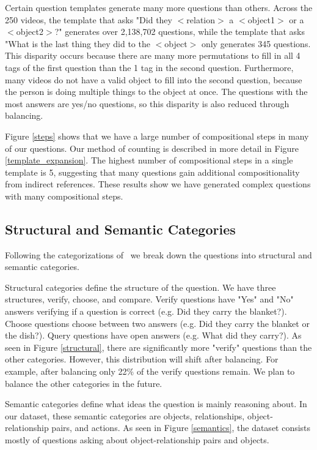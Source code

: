\documentclass[10pt,twocolumn,letterpaper]{article}
\begin{document}
Certain question templates generate many more questions than others. Across the 250 videos, the template that asks "Did they $<$relation$>$ a $<$object1$>$ or a $<$object2$>$?" generates over 2,138,702 questions, while the template that asks "What is the last thing they did to the $<$object$>$ only generates 345 questions. This disparity occurs because there are many more permutations to fill in all 4 tags of the first question than the 1 tag in the second question. Furthermore, many videos do not have a valid object to fill into the second question, because the person is doing multiple things to the object at once. The questions with the most answers are yes/no questions, so this disparity is also reduced through balancing. 

Figure \ref{steps} shows that we have a large number of compositional steps in many of our questions. Our method of counting is described in more detail in Figure \ref{template_expansion}. The highest number of compositional steps in a single template is 5, suggesting that many questions gain additional compositionality from indirect references. These results show we have generated complex questions with many compositional steps. 


\subsection{Structural and Semantic Categories}

Following the categorizations of~\cite{hudson2019gqa} we break down the questions into structural and semantic categories. 

Structural categories define the structure of the question. We have three structures, verify, choose, and compare. Verify questions have "Yes" and "No" answers verifying if a question is correct (e.g. Did they carry the blanket?). Choose questions choose between two answers (e.g. Did they carry the blanket or the dish?). Query questions have open answers (e.g. What did they carry?). As seen in Figure \ref{structural}, there are significantly more "verify" questions than the other categories. However, this distribution will shift after balancing. For example, after balancing only 22\% of the verify questions remain. We plan to balance the other categories in the future.

Semantic categories define what ideas the question is mainly reasoning about. In our dataset, these semantic categories are objects, relationships, object-relationship pairs, and actions. As seen in Figure \ref{semantics}, the dataset consists mostly of questions asking about object-relationship pairs and objects. 
\end{document}
